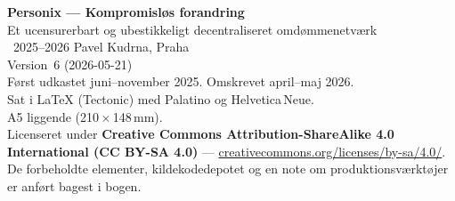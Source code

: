 \thispagestyle{empty}
\ifdefined\printmode\vspace*{\fill}\else{}\fi
\begin{flushleft}\small\sffamily
\textbf{Personix --- Kompromisløs forandring}\\[0.3em]
Et ucensurerbart og ubestikkeligt decentraliseret omdømmenetværk\\[1.4em]

\textcopyright\ 2025--2026 Pavel Kudrna, Praha\\[0.4em]

Version~6 (2026-05-21)\\
Først udkastet juni--november 2025. Omskrevet april--maj 2026.\\[1.4em]

Sat i \LaTeX{} (Tectonic) med Palatino og Helvetica\,Neue.\\
A5 liggende (210\,$\times$\,148\,mm).\\[1.4em]

Licenseret under \textbf{Creative Commons Attribution-ShareAlike 4.0
International (CC BY-SA 4.0)} ---
\href{https://creativecommons.org/licenses/by-sa/4.0/}{creativecommons.org/licenses/by-sa/4.0/}.
De forbeholdte elementer, kildekodedepotet og en note om produktionsværktøjer
er anført bagest i bogen.
\end{flushleft}
\ifdefined\printmode\else{}\fi
\clearpage
